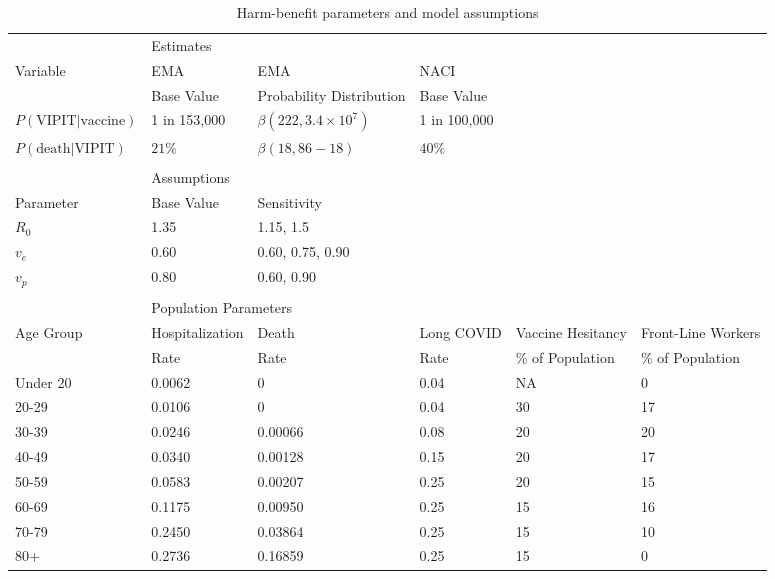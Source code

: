 \documentclass[]{elsarticle} %
\begin{document}
\begin{table}
\caption{Harm-benefit parameters and model assumptions}
{\begin{tabular}{llllll} \toprule
 & \multicolumn{2}{l}{Estimates} \\ \cmidrule{2-6}
 Variable & EMA & EMA  & NACI  \\
  & Base Value & Probability Distribution & Base Value \\ \midrule
 $P(\text{VIPIT}|\text{vaccine})$ & 1 in 153,000 & $\beta(222, 3.4\times 10^7)$ & 1 in 100,000 \\
 $P(\text{death}|\text{VIPIT})$ & $21\%$ &  $\beta(18, 86-18)$ & $40\%$ \\ \\
 & \multicolumn{2}{l}{Assumptions} \\ \cmidrule{2-6}
 Parameter  & Base Value & Sensitivity & \\ \midrule
 $R_0$ & 1.35 & 1.15, 1.5 &  \\ 
 $v_e$ & 0.60 & 0.60, 0.75, 0.90 &  \\ 
 $v_p$ & 0.80 & 0.60, 0.90 &  \\ \\
 
  & \multicolumn{2}{l}{Population Parameters} \\ \cmidrule{2-6}
  Age  Group & Hospitalization & Death   & Long COVID & Vaccine Hesitancy & Front-Line Workers \\ 
             & Rate            & Rate    & Rate       & \% of Population & \% of Population \\ 

  \midrule
Under 20   & 0.0062    & 0       & 0.04       & NA                & 0           \\ 
20-29      & 0.0106    & 0       & 0.04       & 30               & 17          \\ 
30-39      & 0.0246    & 0.00066 & 0.08       & 20               & 20          \\ 
40-49      & 0.0340    & 0.00128 & 0.15       & 20               & 17          \\ 
50-59      & 0.0583    & 0.00207 & 0.25       & 20               & 15          \\ 
60-69      & 0.1175    & 0.00950 & 0.25       & 15              & 16          \\ 
70-79      & 0.2450    & 0.03864 & 0.25       & 15              & 10          \\ 
80+        & 0.2736    & 0.16859 & 0.25       & 15              & 0           \\
 

\end{tabular}}
\end{table}
\end{document}

